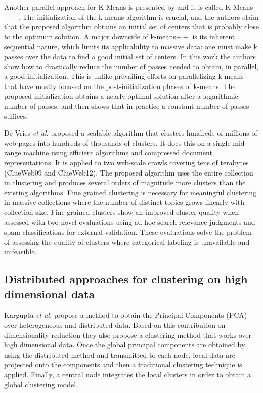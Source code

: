 \documentclass[smallextended]{svjour3}       %
\begin{document}
Another parallel approach for K-Means is presented by \cite{BMVKV12} and it is called K-Means$++$. The initialization of the k means algorithm is crucial, and the authors claim that the proposed algorithm obtains an initial set of centers that is probably close to the optimum solution. A major downside of k-means$++$ is its inherent sequential nature, which limits its applicability to massive data: one must make k passes over the data to find a good initial set of centers. In this work the authors show how to drastically reduce the number of passes needed to obtain, in parallel, a good initialization. This is unlike prevailing efforts on parallelizing k-means that have mostly focused on the post-initialization phases of k-means. The proposed initialization obtains a nearly optimal solution after a logarithmic number of passes, and then shows that in practice a constant number of passes suffices. 

De Vries \textit{et al.} \cite{VVGN15} proposed a scalable algorithm that clusters hundreds of millions of web pages into hundreds of thousands of clusters. It does this on a single mid-range machine using efficient algorithms and compressed document representations. It is applied to two web-scale crawls covering tens of terabytes (ClueWeb09 and ClueWeb12). %
The proposed algorithm uses the entire collection in clustering and produces several orders of magnitude more clusters than the existing algorithms. Fine grained clustering is necessary for meaningful clustering in massive collections where the number of distinct topics grows linearly with collection size. Fine-grained clusters show an improved cluster quality when assessed with two novel evaluations using ad-hoc search relevance judgments and spam classifications for external validation. These evaluations solve the problem of assessing the quality of clusters where categorical labeling is unavailable and unfeasible.

\subsection{Distributed approaches for clustering on high dimensional data}

Kargupta \textit{et al.} \cite{KHSJ01} propose a method to obtain the Principal Components (PCA) over heterogeneous and distributed data. Based on this contribution on dimensionality reduction they also propose a clustering method that works over high dimensional data. Once the global principal components are obtained by using the distributed method and transmitted to each node, local data are projected onto the components and then a traditional clustering technique is applied. Finally, a central node integrates the local clusters in order to obtain a global clustering model.
\end{document}
